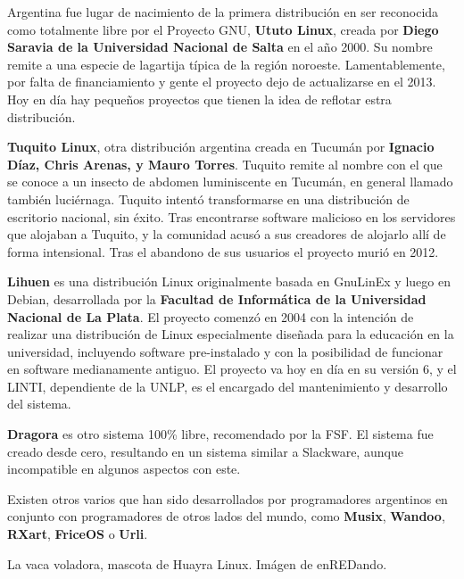 Argentina fue lugar de nacimiento de la primera distribución en ser reconocida
como totalmente libre por el Proyecto GNU, \textbf{Ututo Linux}, creada por
\textbf{Diego Saravia de la Universidad Nacional de Salta} en el año 2000. Su
nombre remite a una especie de lagartija típica de la región noroeste.
Lamentablemente, por falta de financiamiento y gente el proyecto dejo de
actualizarse en el 2013. Hoy en día hay pequeños proyectos que tienen la idea de
reflotar estra distribución.

\textbf{Tuquito Linux}, otra distribución argentina creada en Tucumán por
\textbf{Ignacio Díaz, Chris Arenas, y Mauro Torres}. Tuquito remite al nombre
con el que se conoce a un insecto de abdomen luminiscente en Tucumán, en general
llamado también luciérnaga. Tuquito intentó transformarse en una distribución de
escritorio nacional, sin éxito. Tras encontrarse software malicioso en los
servidores que alojaban a Tuquito, y la comunidad acusó a sus creadores de
alojarlo allí de forma intensional. Tras el abandono de sus usuarios el proyecto
murió en 2012.

\textbf{Lihuen} es una distribución Linux originalmente basada en GnuLinEx y
luego en Debian, desarrollada por la \textbf{Facultad de Informática de la
Universidad Nacional de La Plata}. El proyecto comenzó en 2004 con la intención
de realizar una distribución de Linux especialmente diseñada para la educación
en la universidad, incluyendo software pre-instalado y con la posibilidad de
funcionar en software medianamente antiguo. El proyecto va hoy en día en su
versión 6, y el LINTI, dependiente de la UNLP, es el encargado del mantenimiento
y desarrollo del sistema.

\textbf{Dragora} es otro sistema 100\% libre, recomendado por la FSF. El sistema
fue creado desde cero, resultando en un sistema similar a Slackware, aunque
incompatible en algunos aspectos con este.

Existen otros varios que han sido desarrollados por programadores argentinos en
conjunto con programadores de otros lados del mundo, como \textbf{Musix},
\textbf{Wandoo}, \textbf{RXart}, \textbf{FriceOS} o \textbf{Urli}.

{La vaca voladora, mascota de Huayra Linux.} {Imágen de enREDando.}

